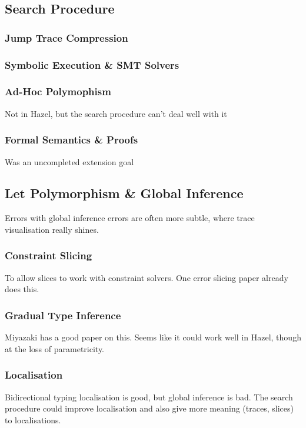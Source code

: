 \subsection{Search Procedure}
\subsubsection{Jump Trace Compression}
\subsubsection{Symbolic Execution \& SMT Solvers}
\subsubsection{Ad-Hoc Polymophism}
Not in Hazel, but the search procedure can't deal well with it
\subsubsection{Formal Semantics \& Proofs}
Was an uncompleted extension goal

\subsection{Let Polymorphism \& Global Inference}
Errors with global inference errors are often more subtle, where trace visualisation really shines. 
\subsubsection{Constraint Slicing}
To allow slices to work with constraint solvers. One error slicing paper already does this.

\subsubsection{Gradual Type Inference}
Miyazaki has a good paper on this. Seems like it could work well in Hazel, though at the loss of parametricity.

\subsubsection{Localisation}
Bidirectional typing localisation is good, but global inference is bad. The search procedure could improve localisation and also give more meaning (traces, slices) to localisations.